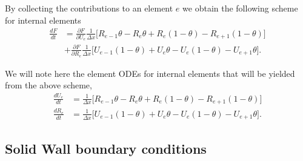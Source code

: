 \documentclass[a4paper,11pt]{article}
\begin{document}
By collecting the contributions to an element $e$ we obtain the following scheme for internal elements
\begin{equation}
\begin{aligned}
\frac{d F}{d t} & =\frac{\partial F}{\partial U_{e}}\frac{1}{\Delta x}\bigg [    R_{e-1} \theta - R_{e} \theta+ R_{e}(1-\theta) - R_{e+1}(1-\theta)                         \bigg]\\
&+\frac{\partial F}{\partial R_{e}}\frac{1}{\Delta x}\bigg [    U_{e-1}(1-\theta)  + U_{e} \theta  - U_{e}(1-\theta)    - U_{e+1}\theta        \bigg].
\end{aligned}
\end{equation}

We will note here the element ODEs for internal elements that will be yielded from the above scheme,
\begin{equation}
\begin{aligned}
\frac{d U_e}{d t} & = \frac{1}{\Delta x}\bigg [    R_{e-1} \theta - R_{e} \theta+ R_{e}(1-\theta) - R_{e+1}(1-\theta)      \bigg]\\
\frac{d R_e}{d t} & = \frac{1}{\Delta x}\bigg [  U_{e-1}(1-\theta)  + U_{e} \theta  - U_{e}(1-\theta)    - U_{e+1}\theta          \bigg].
\end{aligned}
\end{equation}

\subsection{ Solid Wall boundary conditions}
\end{document}
